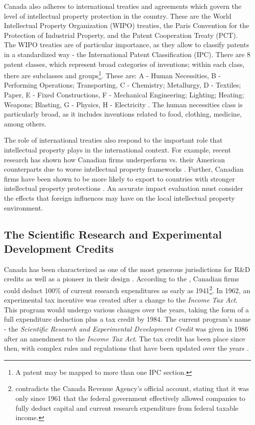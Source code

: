 \documentclass[../main.tex]{subfiles}
\begin{document}

Canada also adheres to international treaties and agreements which govern the level of intellectual property protection in the country. These are the World Intellectual Property Organization (WIPO) treaties, the Paris Convention for the Protection of Industrial Property, and the Patent Cooperation Treaty (PCT). The WIPO treaties are of particular importance, as they allow to classify patents in a standardized way - the International Patent Classification (IPC). There are 8 patent classes, which represent broad categories of inventions; within each class, there are subclasses and groups\footnote{A patent may be mapped to more than one IPC section.}. These are: A - Human Necessities, B - Performing Operations; Transporting, C - Chemistry; Metallurgy, D - Textiles; Paper, E - Fixed Constructions, F - Mechanical Engineering; Lighting; Heating; Weapons; Blasting, G - Physics, H - Electricity \parencite{worldintellectualpropertyorganization24}. The human necessities class is particularly broad, as it includes inventions related to food, clothing, medicine, among others. 
 
The role of international treaties also respond to the important role that intellectual property plays in the international context. For example, recent research has shown how Canadian firms underperform vs. their American counterparts due to worse intellectual property frameworks \parencite{carew_etal06}. Further, Canadian firms have been shown to be more likely to export to countries with stronger intellectual property protections \parencite{rafiquzzaman02}. An accurate impact evaluation must consider the effects that foreign influences may have on the local intellectual property environment.

\subsection{The Scientific Research and Experimental Development Credits}

Canada has been characterized as one of the most generous jurisdictions for R\&D credits \parencite{mckenzie08} as well as a pioneer in their design \parencite{mansfield_switzer85a}. According to the \textcite{canadarevenueagency23}, Canadian firms could deduct 100\% of current research expenditures as early as 1941\footnote{\textcite{mansfield_switzer85a} contradicts the Canada Revenue Agency's official account, stating that it was only since 1961 that the federal government effectively allowed companies to fully deduct capital and current research expenditure from federal taxable income.}. In 1962, an experimental tax incentive was created after a change to the \textit{Income Tax Act}. This program would undergo various changes over the years, taking the form of a full expenditure deduction plus a tax credit by 1984. The current program's name - the \textit{Scientific Research and Experimental Development Credit} was given in 1986 after an amendment to the \textit{Income Tax Act}. The tax credit has been place since then, with complex rules and regulations that have been updated over the years \parencite{canadarevenueagency15}.
\end{document}

